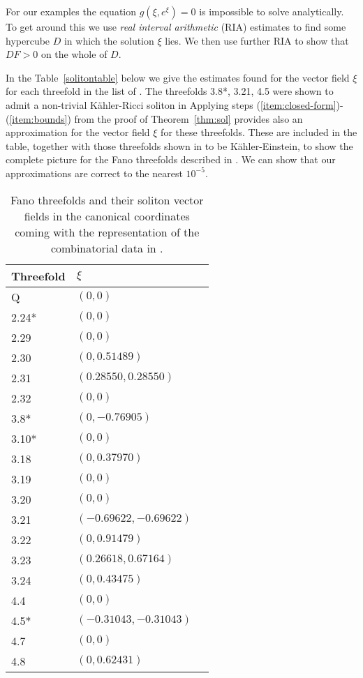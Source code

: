 For our examples the equation \(g(\xi,e^{\xi}) = 0\) is impossible to solve analytically. To get around this we use \textit{real interval arithmetic} (RIA) estimates to find some hypercube \(D\) in which the solution \(\xi\) lies. We then use further RIA to show that \(DF>0\) on the whole of \(D\).

In the Table~\ref{solitontable} below we give the estimates found for the vector field \(\xi\) for each threefold in the list of \cite{suss2013fano}. The threefolds 3.8*, 3.21, 4.5 were shown to admit a non-trivial K\"ahler-Ricci soliton in \cite{ilten2015} Applying 
steps (\ref{item:closed-form})-(\ref{item:bounds}) from the proof of Theorem~\ref{thm:sol} provides also an approximation for the vector field \(\xi\) for these threefolds. These are included in the table, together with those threefolds shown in \cite{ilten2015} to be K\"ahler-Einstein, to show the complete picture for the Fano threefolds described in \cite{suss2013fano}. We can show that our approximations are correct to the nearest \(10^{-5}\).
%
%
%
\begin{table}[h] \centering \label{solitontable}
\captionsetup{width=.95\linewidth}
\caption{Fano threefolds and their soliton vector fields in the canonical coordinates coming with the representation of the combinatorial data in \cite{suss2013fano}.}
\begin{tabular}{l l l}
\toprule
Threefold & $\xi$ & \\ \hline
\rowstyle{\color{gray}}
Q & $(0,0)$ \\
\rowstyle{\color{gray}}
2.24* & $(0,0)$ \\
\rowstyle{\color{gray}}
2.29 & $(0,0)$ \\
2.30 & $(0,0.51489)$ \\
2.31 & $(0.28550,0.28550)$\\
\rowstyle{\color{gray}}
2.32 & $(0,0)$ \\
3.8* & $(0,-0.76905)$ \\
\rowstyle{\color{gray}}
3.10* & $(0,0)$ \\
3.18 & $(0,0.37970)$ \\
\rowstyle{\color{gray}}
3.19 & $(0,0)$ \\
\rowstyle{\color{gray}}
3.20 & $(0,0)$ \\
3.21 & $(-0.69622,-0.69622)$ \\
3.22 & $(0,0.91479)$ \\
3.23 & $(0.26618,  0.67164)$ \\
3.24 & $(0,0.43475)$ \\
\rowstyle{\color{gray}}
4.4 &  $(0,0)$ \\
4.5* &  $(-0.31043,-0.31043)$ \\
\rowstyle{\color{gray}}
4.7 &  $(0,0)$ \\
4.8 &  $(0,0.62431)$ \\
\bottomrule
\end{tabular}
\label{table:name}
\end{table}


